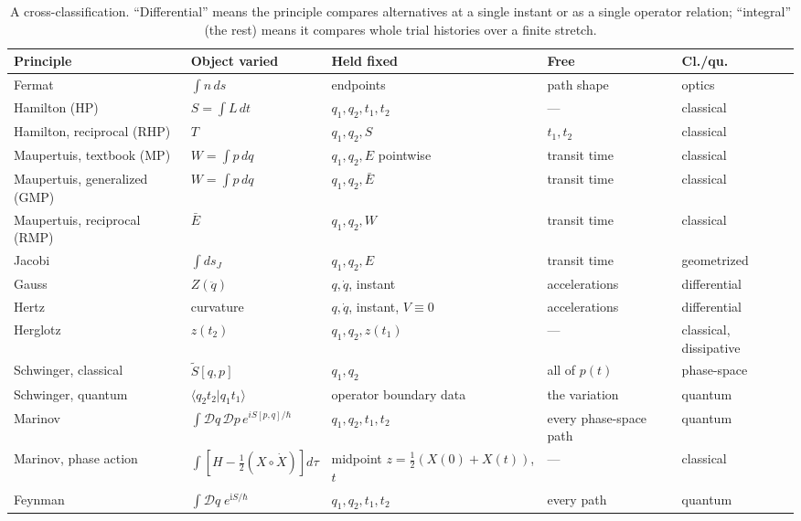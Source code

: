 \documentclass[11pt]{book}
\theoremstyle{definition}
\theoremstyle{plain}
\theoremstyle{remark}
\newcommand{\ii}{\mathrm{i}}
\begin{document}
\begin{table}[ht]
\centering
\footnotesize
\renewcommand{\arraystretch}{1.35}
\begin{tabularx}{\textwidth}{@{}lXXXl@{}}
\toprule
Principle & Object varied & Held fixed & Free & Cl./qu. \\
\midrule
Fermat & $\int n\,ds$ & endpoints & path shape & optics \\
Hamilton (HP) & $S=\int L\,dt$ & $q_1,q_2,t_1,t_2$ & --- & classical \\
Hamilton, reciprocal (RHP) & $T$ & $q_1,q_2,S$ & $t_1,t_2$ & classical \\
Maupertuis, textbook (MP) & $W=\int p\,dq$ & $q_1,q_2,E$ pointwise & transit time & classical \\
Maupertuis, generalized (GMP) & $W=\int p\,dq$ & $q_1,q_2,\bar E$ & transit time & classical \\
Maupertuis, reciprocal (RMP) & $\bar E$ & $q_1,q_2,W$ & transit time & classical \\
Jacobi & $\int ds_J$ & $q_1,q_2,E$ & transit time & geometrized \\
Gauss & $Z(\ddot q)$ & $q,\dot q$, instant & accelerations & differential \\
Hertz & curvature & $q,\dot q$, instant, $V\!\equiv\!0$ & accelerations & differential \\
Herglotz & $z(t_2)$ & $q_1,q_2,z(t_1)$ & --- & classical, dissipative \\
Schwinger, classical & $\tilde S[q,p]$ & $q_1,q_2$ & all of $p(t)$ & phase-space \\
Schwinger, quantum & $\langle q_2t_2|q_1t_1\rangle$ & operator boundary data & the variation & quantum \\
Marinov & $\int\mathcal Dq\,\mathcal Dp\,e^{iS[p,q]/\hbar}$ & $q_1,q_2,t_1,t_2$ & every phase-space path & quantum \\
Marinov, phase action & $\int[H-\tfrac12(X\circ\dot X)]d\tau$ & midpoint $z=\tfrac12(X(0){+}X(t))$, $t$ & --- & classical \\
Feynman & $\int\!\mathcal D q\;e^{\ii S/\hbar}$ & $q_1,q_2,t_1,t_2$ & every path & quantum \\
\bottomrule
\end{tabularx}
\caption{A cross-classification. ``Differential'' means the principle compares alternatives at a single instant or as a single operator relation; ``integral'' (the rest) means it compares whole trial histories over a finite stretch.}
\label{tab:summary}
\end{table}
\end{document}
